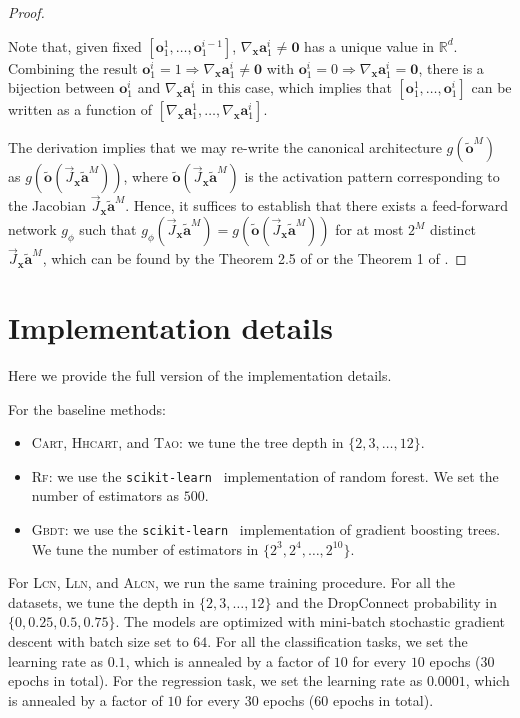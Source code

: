 \documentclass{article} \usepackage{iclr2020_conference,times}
\def\va{{\bm{a}}}
\def\vo{{\bm{o}}}
\def\vx{{\bm{x}}}
\def\sR{{\mathbb{R}}}
\begin{document}
\begin{proof}
\begin{enumerate}[leftmargin=4mm]
    Note that, given fixed $[\vo^1_1,\dots,\vo^{i-1}_1]$, $\nabla_\vx \va^i_1 \neq \textbf{0}$ has a unique value in $\sR^d$. Combining the result $\vo^i_1 = 1 \Rightarrow \nabla_\vx \va^i_1 \neq \textbf{0}$ with $\vo^i_1 = 0 \Rightarrow \nabla_{\vx} \va^i_1 = \textbf{0}$, there is a bijection between $\vo^i_1$ and $\nabla_\vx \va^i_1$ in this case, which implies that $[\vo^1_1,\dots,\vo^{i}_1]$ can be written as a function of $[\nabla_\vx \va^1_1, \dots , \nabla_\vx  \va^{i}_1]$.\!\!\!
\end{enumerate}

The derivation implies that we may re-write the canonical architecture $g(\tilde \vo^M)$ as $g(\tilde \vo(\vec J_\vx \tilde \va^M))$, where $\tilde \vo(\vec J_\vx \tilde \va^M)$ is the activation pattern corresponding to the Jacobian $\vec J_\vx \tilde \va^M$. Hence, it suffices to establish that there exists a feed-forward network $g_\phi$ such that $g_\phi(\vec J_\vx \tilde \va^M) = g(\tilde \vo(\vec J_\vx \tilde \va^M))$ for at most $2^M$ distinct $\vec J_\vx \tilde \va^M$, which can be found by the Theorem 2.5 of \citet{hornik1989multilayer} or the Theorem 1 of \citet{zhang2016understanding}.
\end{proof}

\vspace{-1mm}
\section{Implementation details}\label{appendix:exp:implementation}
\vspace{-1mm}
Here we provide the full version of the implementation details.

For the baseline methods:
\begin{itemize}[leftmargin=4mm]
\vspace{-1mm}
    \item \textsc{Cart}, \textsc{Hhcart}, and \textsc{Tao}: we tune the tree depth in $\{2,3,\dots,12\}$.
\vspace{-1mm}
    \item \textsc{Rf}: we use the \texttt{scikit-learn}~\citep{pedregosa2011scikit} implementation of random forest. We set the number of estimators as $500$.
\vspace{-1mm}
    \item \textsc{Gbdt}: we use the \texttt{scikit-learn}~\citep{pedregosa2011scikit} implementation of gradient boosting trees. We tune the number of estimators in $\{2^3, 2^4,\dots,2^{10}\}$.
\vspace{-1mm}
\end{itemize}
For \textsc{Lcn}, \textsc{Lln}, and \textsc{Alcn}, we run the same training procedure. For all the datasets, we tune the depth in $\{2,3,\dots,12\}$ and the DropConnect probability in $\{0, 0.25, 0.5, 0.75\}$. 
The models are optimized with mini-batch stochastic gradient descent with batch size set to $64$. For all the classification tasks, we set the learning rate as $0.1$, which is annealed by a factor of $10$ for every $10$ epochs ($30$ epochs in total). For the regression task, we set the learning rate as $0.0001$, which is annealed by a factor of $10$ for every $30$ epochs ($60$ epochs in total).
\end{document}

